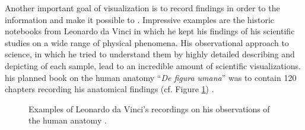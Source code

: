 Another important goal of visualization is to record findings in order to  the information and make it possible to .
Impressive examples are the historic notebooks from Leonardo da Vinci in which he kept his findings of his scientific studies on a wide range of physical phenomena. 
His observational approach to science, in which he tried to understand them by highly detailed describing and depicting of each sample, lead to an incredible amount of scientific visualizations.
 his planned book on the human anatomy ``\emph{De figura umana}'' was to contain 120 chapters recording his anatomical findings (cf. Figure \ref{fig:leonardo-drawings}) \cite{Capra:2013:LearningFromLeonardo}.
%
\begin{figure}[ht]
	\centering
	\qquad
	\caption{Examples of Leonardo da Vinci's recordings on his observations of the human anatomy \cite{Capra:2013:LearningFromLeonardo}.}
	\label{fig:leonardo-drawings}
\end{figure}

